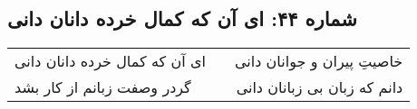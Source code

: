 \begin{center}
\section*{شماره ۴۴: ای آن که کمال خرده دانان دانی}
\label{sec:044}
\begin{longtable}{l p{0.5cm} r}
ای آن که کمال خرده دانان دانی
&&
خاصیتِ پیران و جوانان دانی
\\
گردر وصفت زبانم از کار بشد
&&
دانم که زبان بی زبانان دانی
\\
\end{longtable}
\end{center}

